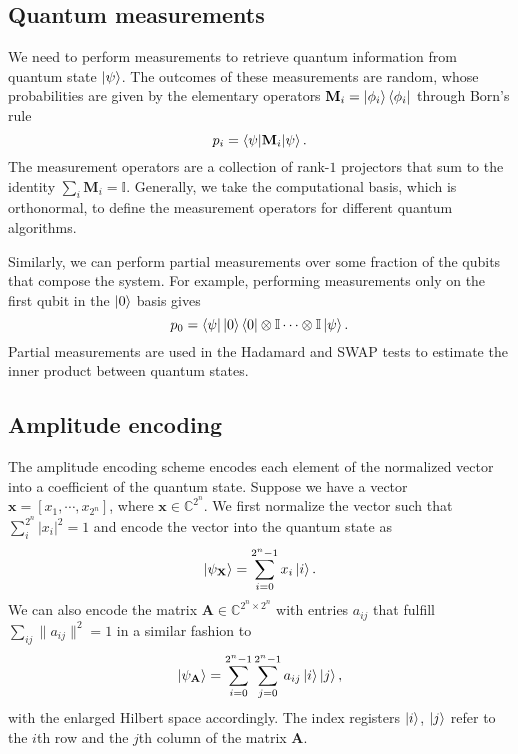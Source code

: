 \documentclass[10pt]{article}
\begin{document}
	\subsection{\label{app: Measurement}Quantum measurements}
	We need to perform measurements to retrieve quantum information from quantum state $\ket{\psi}$. The outcomes of these measurements are random, whose probabilities are given by the elementary operators $\mathbf{M}_{i}=\ket{\phi_{i}}\bra{\phi_{i}}$ through Born's rule \citep{Nielsen2011QuantumComputing}
	\begin{equation}
		p_{i}=\braket{\psi|\mathbf{M}_{i}|\psi}.
	\end{equation}
	The measurement operators are a collection of rank-$1$ projectors that sum to the identity $\sum_{i}\mathbf{M}_{i}=\mathbb{I}$. Generally, we take the computational basis, which is orthonormal, to define the measurement operators for different quantum algorithms.
	
	Similarly, we can perform partial measurements over some fraction of the qubits that compose the system. For example, performing measurements only on the first qubit in the $\ket{0}$ basis gives
	\begin{equation}
		p_{0}=\bra{\psi}\ket{0}\bra{0}\otimes \mathbb{I}\cdots \otimes \mathbb{I}\ket{\psi}.
	\end{equation}
	Partial measurements are used in the Hadamard and SWAP tests to estimate the inner product between quantum states.
	\subsection{\label{app: Encoding}Amplitude encoding}
	
	The amplitude encoding scheme encodes each element of the normalized vector into a coefficient of the quantum state. Suppose we have a vector
	$
	\mathbf{x}=[
	x_{1},
	\cdots,
	x_{2^{n}}
	]
	$, where $\mathbf{x}\in \mathbb{C}^{2^{n}}$. We first normalize the vector such that $\sum_{i}^{2^{n}}|x_{i}|^{2}=1$ and encode the vector into the quantum state as \citep{Schuld2021QML}
	\begin{equation}
		\ket{\psi_{\mathbf{X}}}=\sum_{i=0}^{2^{n}-1}x_{i}\ket{i}.
	\end{equation}
	We can also encode the matrix $\mathbf{A}\in \mathbb{C}^{2^{n}\times 2^{n}}$ with entries $a_{ij}$ that fulfill $\sum_{ij}\|a_{ij}\|^{2}=1$ in a similar fashion to 
	\begin{equation}
		\ket{\psi_{\mathbf{A}}}=\sum_{i=0}^{2^{n}-1}\sum_{j=0}^{2^{n}-1}a_{ij}\ket{i}\ket{j},
	\end{equation}
	with the enlarged Hilbert space accordingly. The index registers $\ket{i}$, $\ket{j}$ refer to the $i$th row and the $j$th column of the matrix $\mathbf{A}$.
\end{document}

